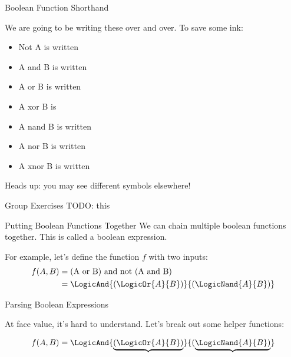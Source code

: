 \begin{frame}{Boolean Function Shorthand}

	We are going to be writing these over and over. To save some ink:

	\begin{itemize}
		\item Not A is written 
		\item A and B is written 
		\item A or B is written 
		\item A xor B is 
		\item A nand B is written 
		\item A nor B is written 
		\item A xnor B is written 
	\end{itemize}

	Heads up: you may see different symbols elsewhere!

\end{frame}


\begin{frame}{Group Exercises}
TODO: this
\end{frame}





\begin{frame}{Putting Boolean Functions Together}
	We can chain multiple boolean functions together. This is called a boolean expression.


	For example, let's define the function $f$ with two inputs:
	\begin{align*}
		f(A, B) & = \text{(A or B) and not (A and B)}               \\
		        & = \LogicAnd{(\LogicOr{A}{B})}{(\LogicNand{A}{B})} \\
	\end{align*}
\end{frame}


\begin{frame}{Parsing Boolean Expressions}

	At face value, it's hard to understand. Let's break out some helper functions:

	\begin{align*}
		f(A, B) & = \LogicAnd{\underbrace{(\LogicOr{A}{B})}}{(\underbrace{\LogicNand{A}{B})}} \\
	\end{align*}

\end{frame}


